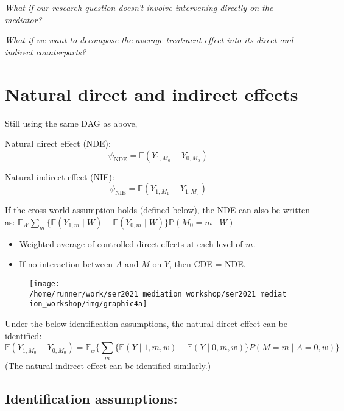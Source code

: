 \documentclass[
  12pt,
]{book}
\providecommand{\tightlist}{%
  \setlength{\itemsep}{0pt}\setlength{\parskip}{0pt}}
\theoremstyle{definition}
\theoremstyle{definition}
\theoremstyle{definition}
\renewcommand{\P}{\mathbb{P}}
\newcommand{\E}{\mathbb{E}}
\newcommand{\1}{\mathbbm{1}}
\begin{document}
\emph{What if our research question doesn't involve intervening directly on the
mediator?}

\emph{What if we want to decompose the average treatment effect into its direct and
indirect counterparts?}

\hypertarget{natural-direct-and-indirect-effects}{%
\section{Natural direct and indirect effects}\label{natural-direct-and-indirect-effects}}

Still using the same DAG as above,

Natural direct effect (NDE):
\begin{equation*}
  \psi_{\text{NDE}} = \E(Y_{1,M_0} - Y_{0,M_0})
\end{equation*}

Natural indirect effect (NIE):
\begin{equation*}
  \psi_{\text{NIE}} = \E(Y_{1,M_1} - Y_{1,M_0})
\end{equation*}

If the cross-world assumption holds (defined below), the NDE can also be written
as: \(\E_W \sum_m \{\E(Y_{1,m} \mid W) - \E(Y_{0,m} \mid W)\} \P(M_{0}=m \mid W)\)

\begin{itemize}
\tightlist
\item
  Weighted average of controlled direct effects at each level of \(m\).
\item
  If no interaction between \(A\) and \(M\) on \(Y\), then CDE = NDE.
\end{itemize}

\begin{figure}

{\centering \texttt{[image: /home/runner/work/ser2021\_mediation\_workshop/ser2021\_mediation\_workshop/img/graphic4a]} 

}

\end{figure}

Under the below identification assumptions, the natural direct effect can be identified:
\begin{equation*}
\E(Y_{1,M_0} - Y_{0,M_0}) =
  \E_w\{\sum_m \{\E(Y \mid 1, m, w) - \E(Y \mid 0, m, w)\} P(M=m \mid A=0,w)\}
\end{equation*}
(The natural indirect effect can be identified similarly.)

\hypertarget{identification-assumptions-1}{%
\subsection{Identification assumptions:}\label{identification-assumptions-1}}
\end{document}
